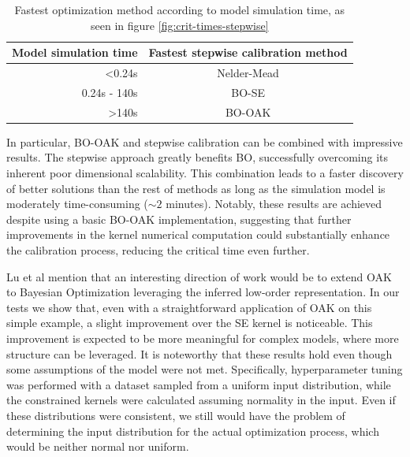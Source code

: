 \documentclass[sn-mathphys,Numbered]{sn-jnl}%
\begin{document}
\begin{table}[h!]
	\begin{tabular*}{.75\textwidth}{@{\extracolsep\fill}rc}
		\textbf{Model simulation time} & \textbf{Fastest stepwise calibration method} \\ \hline
		\textless{}0.24s & Nelder-Mead \\
		0.24s - 140s & BO-SE \\
		\textgreater{}140s & BO-OAK
	\end{tabular*}
	\smallskip
	\caption{Fastest optimization method according to model simulation time, as seen in figure \ref{fig:crit-times-stepwise}}
	\label{tab:crit-times-stepwise}	
\end{table}

In particular, BO-OAK and stepwise calibration can be combined with impressive results. The stepwise approach greatly benefits BO, successfully overcoming its inherent poor dimensional scalability. This combination leads to a faster discovery of better solutions than the rest of methods as long as the simulation model is moderately time-consuming ($\sim 2$ minutes). Notably, these results are achieved despite using a basic BO-OAK implementation, suggesting that further improvements in the kernel numerical computation could substantially enhance the calibration process, reducing the critical time even further.

Lu et al\cite{gp-additive-orthogonal} mention that an interesting direction of work would be to extend OAK to Bayesian Optimization leveraging the inferred low-order representation. In our tests we show that, even with a straightforward application of OAK on this simple example, a slight improvement over the SE kernel is noticeable. This improvement is expected to be more meaningful for complex models, where more structure can be leveraged. It is noteworthy that these results hold even though some assumptions of the model were not met. Specifically, hyperparameter tuning was performed with a dataset sampled from a uniform input distribution, while the constrained kernels were calculated assuming normality in the input. Even if these distributions were consistent, we still would have the problem of determining the input distribution for the actual optimization process, which would be neither normal nor uniform.

\end{document}
